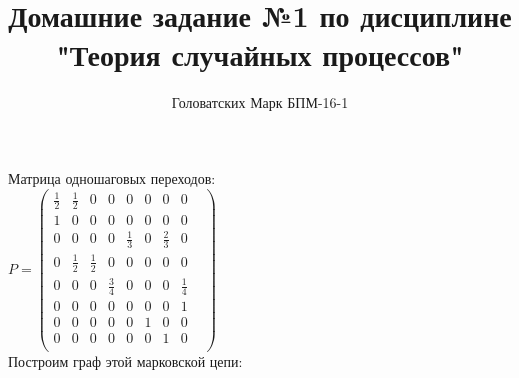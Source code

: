 \documentclass [a4paper,12pt]{article}
\title{Домашние задание №1 по дисциплине "Теория случайных процессов"}
\author{Головатских Марк БПМ-16-1}
\begin{document}
\maketitle
{}
\newpage
{}
Матрица одношаговых переходов:\\

$P = \left(
\begin{matrix}
\frac{1}{2} & \frac{1}{2} & 0 & 0&0&0&0&0\\
1 & 0 & 0 & 0&0&0&0&0&\\
0 & 0 & 0 & 0&\frac{1}{3}&0&\frac{2}{3}&0\\
0 & \frac{1}{2} & \frac{1}{2} & 0&0&0&0&0\\
0 & 0 & 0 & \frac{3}{4}&0&0&0&\frac{1}{4}\\
0 & 0 & 0 & 0&0&0&0&1\\
0 & 0 & 0 & 0&0&1&0&0\\
0 & 0 & 0 & 0&0&0&1&0\\
\end{matrix}
\right) $\\

Построим граф этой марковской цепи:\\
\end{document}
